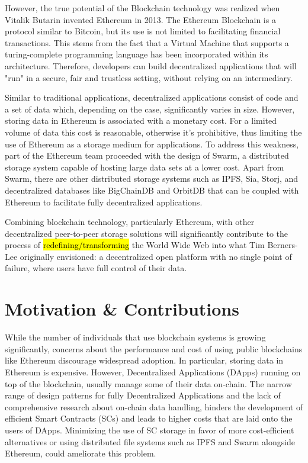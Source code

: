 However, the true potential of the Blockchain technology was realized when Vitalik Butarin invented Ethereum in 2013. The Ethereum Blockchain is a protocol similar to Bitcoin, but its use is not limited to facilitating financial transactions. This stems from the fact that a Virtual Machine that supports a turing-complete programming language has been incorporated within its architecture. Therefore, developers can build decentralized applications that will "run" in a secure, fair and trustless setting, without relying on an intermediary. 

Similar to traditional applications, decentralized applications consist of code and a set of data which, depending on the case, significantly varies in size. However, storing data in Ethereum is associated with a monetary cost. For a limited volume of data this cost is reasonable, otherwise it's prohibitive, thus limiting the use of Ethereum as a storage medium for applications. To address this weakness, part of the Ethereum team proceeded with the design of Swarm, a distributed storage system capable of hosting large data sets at a lower cost. Apart from Swarm, there are other distributed storage systems such as IPFS, Sia, Storj, and decentralized databases like BigChainDB and OrbitDB that can be coupled with Ethereum to facilitate fully decentralized applications. 

Combining blockchain technology, particularly Ethereum, with other decentralized peer-to-peer storage solutions will significantly contribute to the process of \hl{redefining/transforming} the World Wide Web into what Tim Berners-Lee originally envisioned: a decentralized open platform with no single point of failure, where users have full control of their data. 

\section{Motivation \& Contributions}\label{sec:}
While the number of individuals that use blockchain systems is growing significantly, concerns about the performance and cost of using public blockchains like Ethereum \citep{buterin_2014} discourage widespread adoption. In particular, storing data in Ethereum is expensive. However, Decentralized Applications (DApps) running on top of the blockchain, usually manage some of their data on-chain. The narrow range of design patterns for fully Decentralized Applications \citep{wohrer_2021} and the lack of comprehensive research about on-chain data handling, hinders the development of efficient Smart Contracts (SCs) and leads to higher costs that are laid onto the users of DApps. Minimizing the use of SC storage in favor of more cost-efficient alternatives or using distributed file systems such as IPFS \citep{benet_2014} and Swarm \citep{tron_2020} alongside Ethereum, could ameliorate this problem.

